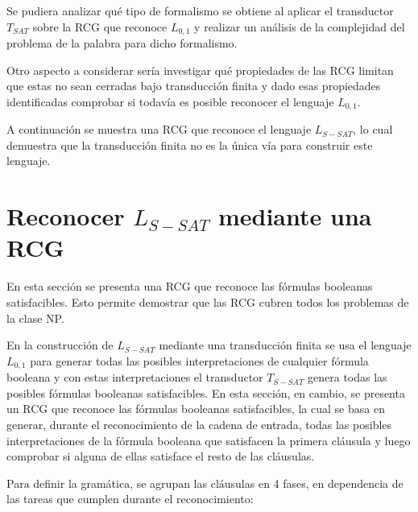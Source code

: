 Se pudiera analizar qué tipo de formalismo se obtiene al aplicar el transductor $T_{SAT}$ sobre
la RCG que reconoce $L_{0,1}$ y realizar un análisis de la complejidad del problema de la palabra
para dicho formalismo.

Otro aspecto a considerar sería investigar qué propiedades de las RCG limitan que estas no sean cerradas bajo transducción finita y dado esas propiedades identificadas comprobar si todavía es posible reconocer el lenguaje $L_{0,1}$.

A continuación se muestra una RCG que reconoce el lenguaje $L_{S-SAT}$, lo cual demuestra que la transducción
finita no es la única vía para construir este lenguaje.

\section{Reconocer $L_{S-SAT}$ mediante una RCG}

En esta sección se presenta una RCG que reconoce las fórmulas booleanas satisfacibles. Esto permite demostrar
que las RCG cubren todos los problemas de la clase NP.

En la construcción de $L_{S-SAT}$ mediante una transducción finita se usa el lenguaje $L_{0,1}$ para generar
todas las posibles interpretaciones de cualquier fórmula booleana y con estas interpretaciones el transductor
$T_{S-SAT}$ genera todas las posibles fórmulas booleanas satisfacibles.  En esta sección, en cambio,
se presenta un RCG que reconoce las fórmulas booleanas satisfacibles, la cual se basa en generar, durante el
reconocimiento de la cadena de entrada, todas las posibles interpretaciones de la fórmula booleana que
satisfacen la primera cláusula y luego comprobar si alguna de ellas satisface el resto de las cláusulas.

Para definir la gramática, se agrupan las cláusulas en 4 fases, en dependencia de las tareas que cumplen durante el reconocimiento:

